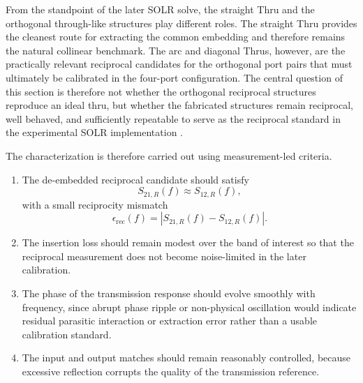 From the standpoint of the later SOLR solve, the straight Thru and the orthogonal through-like structures play different roles. The straight Thru provides the cleanest route for extracting the common embedding and therefore remains the natural collinear benchmark. The arc and diagonal Thrus, however, are the practically relevant reciprocal candidates for the orthogonal port pairs that must ultimately be calibrated in the four-port configuration. The central question of this section is therefore not whether the orthogonal reciprocal structures reproduce an ideal thru, but whether the fabricated structures remain reciprocal, well behaved, and sufficiently repeatable to serve as the reciprocal standard in the experimental SOLR implementation \cite{solr_patent_2010,Daniel2005USF,shakya2025_apmc}.

The characterization is therefore carried out using measurement-led criteria.

\begin{enumerate}
\item The de-embedded reciprocal candidate should satisfy
\begin{equation}
S_{21,R}(f) \approx S_{12,R}(f),
\label{eq:recip_condition_meas}
\end{equation}
with a small reciprocity mismatch
\begin{equation}
\epsilon_{\mathrm{rec}}(f)=\left|S_{21,R}(f)-S_{12,R}(f)\right|.
\label{eq:recip_mismatch}
\end{equation}

\item The insertion loss should remain modest over the band of interest so that the reciprocal measurement does not become noise-limited in the later calibration.

\item The phase of the transmission response should evolve smoothly with frequency, since abrupt phase ripple or non-physical oscillation would indicate residual parasitic interaction or extraction error rather than a usable calibration standard.

\item The input and output matches should remain reasonably controlled, because excessive reflection corrupts the quality of the transmission reference.
\end{enumerate}

